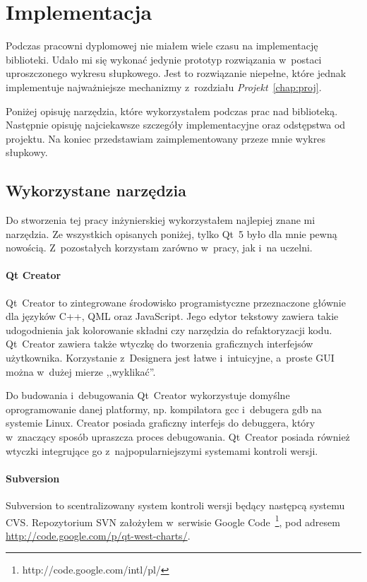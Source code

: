 \chapter{Implementacja}
Podczas pracowni dyplomowej nie miałem wiele czasu na implementację biblioteki. Udało mi się wykonać jedynie prototyp rozwiązania w~postaci uproszczonego wykresu słupkowego. Jest to rozwiązanie niepełne, które jednak implementuje najważniejsze mechanizmy z~rozdziału \textit{Projekt}~\ref{chap:proj}. 

Poniżej opisuję narzędzia, które wykorzystałem podczas prac nad biblioteką. Następnie opisuję najciekawsze szczegóły implementacyjne oraz odstępstwa od projektu. Na koniec przedstawiam zaimplementowany przeze mnie wykres słupkowy.

\section{Wykorzystane narzędzia}
Do stworzenia tej pracy inżynierskiej wykorzystałem najlepiej znane mi narzędzia. Ze wszystkich opisanych poniżej, tylko Qt~5 było dla mnie pewną nowością. Z~pozostałych korzystam zarówno w~pracy, jak i~na uczelni.
 
\subsubsection{Qt Creator}
Qt~Creator to zintegrowane środowisko programistyczne przeznaczone głównie dla języków C++, QML oraz JavaScript. Jego edytor tekstowy zawiera takie udogodnienia jak kolorowanie składni czy narzędzia do refaktoryzacji kodu. Qt~Creator zawiera także wtyczkę do tworzenia graficznych interfejsów użytkownika. Korzystanie z~Designera jest łatwe i~intuicyjne, a~proste GUI można w~dużej mierze ,,wyklikać''.

Do budowania i~debugowania Qt~Creator wykorzystuje domyślne oprogramowanie danej platformy, np. kompilatora gcc i~debugera gdb na systemie Linux. Creator posiada graficzny interfejs do debuggera, który w~znaczący sposób upraszcza proces debugowania. Qt~Creator posiada również wtyczki integrujące go z~najpopularniejszymi systemami kontroli wersji. 

\subsubsection{Subversion}
Subversion to scentralizowany system kontroli wersji będący następcą systemu CVS. Repozytorium SVN założyłem w~serwisie Google Code~\footnote{http://code.google.com/intl/pl/}, pod adresem \url{http://code.google.com/p/qt-west-charts/}.

